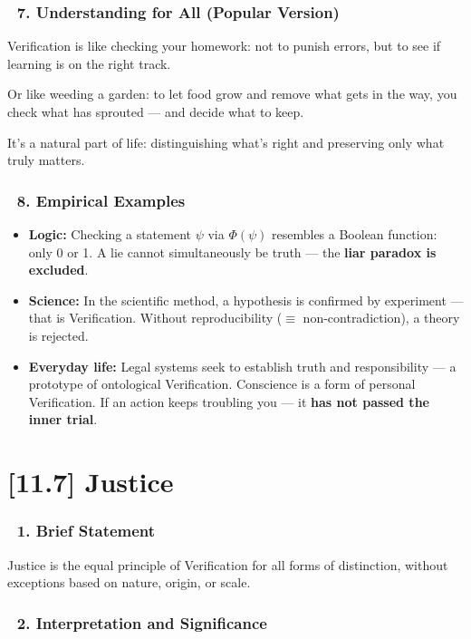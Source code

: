 \documentclass[12pt]{article}
\begin{document}
\subsubsection*{🔹 7. Understanding for All (Popular Version)}

Verification is like checking your homework: not to punish errors, but to see if learning is on the right track.

Or like weeding a garden: to let food grow and remove what gets in the way, you check what has sprouted — and decide what to keep.

It’s a natural part of life: distinguishing what’s right and preserving only what truly matters.

\subsubsection*{🔹 8. Empirical Examples}

\begin{itemize}
\item \textbf{Logic:} Checking a statement $\psi$ via $\Phi(\psi)$ resembles a Boolean function: only 0 or 1. A lie cannot simultaneously be truth — the \textbf{liar paradox is excluded}.
\item \textbf{Science:} In the scientific method, a hypothesis is confirmed by experiment — that is Verification. Without reproducibility ($\equiv$ non-contradiction), a theory is rejected.
\item \textbf{Everyday life:} Legal systems seek to establish truth and responsibility — a prototype of ontological Verification. Conscience is a form of personal Verification. If an action keeps troubling you — it \textbf{has not passed the inner trial}.
\end{itemize}


\section*{[11.7] Justice}

\subsubsection*{🔹 1. Brief Statement}

Justice is the equal principle of Verification for all forms of distinction, without exceptions based on nature, origin, or scale.

\subsubsection*{🔹 2. Interpretation and Significance}
\end{document}
